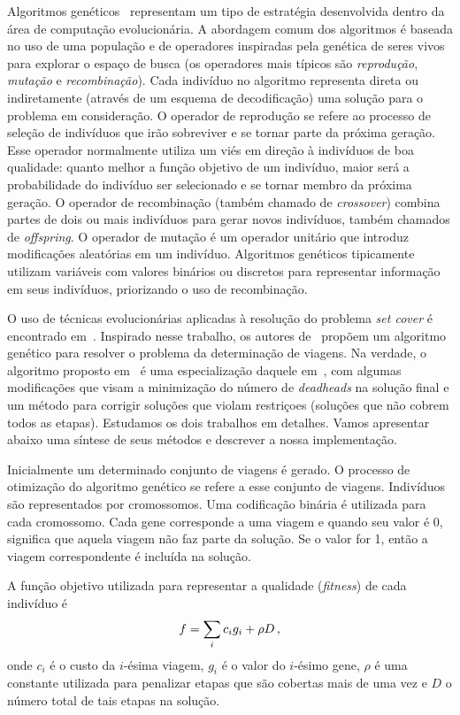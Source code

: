 Algoritmos genéticos~\cite{holland75, goldberg89} representam um tipo de estratégia desenvolvida
dentro da área de computação evolucionária. A abordagem comum dos algoritmos é baseada no uso de uma
população e de operadores inspiradas pela genética de seres vivos para explorar o espaço de busca
(os operadores mais típicos são {\it reprodução}, {\it mutação} e {\it recombinação}). Cada
indivíduo no algoritmo representa direta ou indiretamente (através de um esquema de decodificação)
uma solução para o problema em consideração. O operador de reprodução se refere ao processo de
seleção de indivíduos que irão sobreviver e se tornar parte da próxima geração. Esse operador
normalmente utiliza um viés em direção à indivíduos de boa qualidade: quanto melhor a função
objetivo de um indivíduo, maior será a probabilidade do indivíduo ser selecionado e se tornar membro
da próxima geração. O operador de recombinação (também chamado de {\it crossover}) combina partes de
dois ou mais indivíduos para gerar novos indivíduos, também chamados de {\it offspring}. O operador
de mutação é um operador unitário que introduz modificações aleatórias em um indivíduo. Algoritmos
genéticos tipicamente utilizam variáveis com valores binários ou discretos para representar
informação em seus indivíduos, priorizando o uso de recombinação.

O uso de técnicas evolucionárias aplicadas à resolução do problema {\it set cover} é encontrado
em~\cite{beasley96}. Inspirado nesse trabalho, os autores de~\cite{kornilakis02} propõem um
algoritmo genético para resolver o problema da determinação de viagens. Na verdade, o algoritmo
proposto em~\cite{kornilakis02} é uma especialização daquele em~\cite{beasley96}, com algumas
modificações que visam a minimização do número de {\it deadheads} na solução final e um método para
corrigir soluções que violam restriçoes (soluções que não cobrem todos as etapas). Estudamos os dois
trabalhos em detalhes. Vamos apresentar abaixo uma síntese de seus métodos e descrever a nossa
implementação.

Inicialmente um determinado conjunto de viagens é gerado. O processo de otimização do algoritmo
genético se refere a esse conjunto de viagens. Indivíduos são representados por cromossomos. Uma
codificação binária é utilizada para cada cromossomo. Cada gene corresponde a uma viagem e quando 
seu valor é 0, significa que aquela viagem não faz parte da solução. Se o valor for 1, então a 
viagem correspondente é incluída na solução.

A função objetivo utilizada para representar a qualidade ({\it fitness}) de cada indivíduo é
%
\begin{equation*}
	f = \sum_i c_i g_i + \rho D \, ,
\end{equation*}
%
onde $c_i$ é o custo da $i$-ésima viagem, $g_i$ é o valor do $i$-ésimo gene, $\rho$ é uma
constante utilizada para penalizar etapas que são cobertas mais de uma vez e $D$ o número total de
tais etapas na solução.

